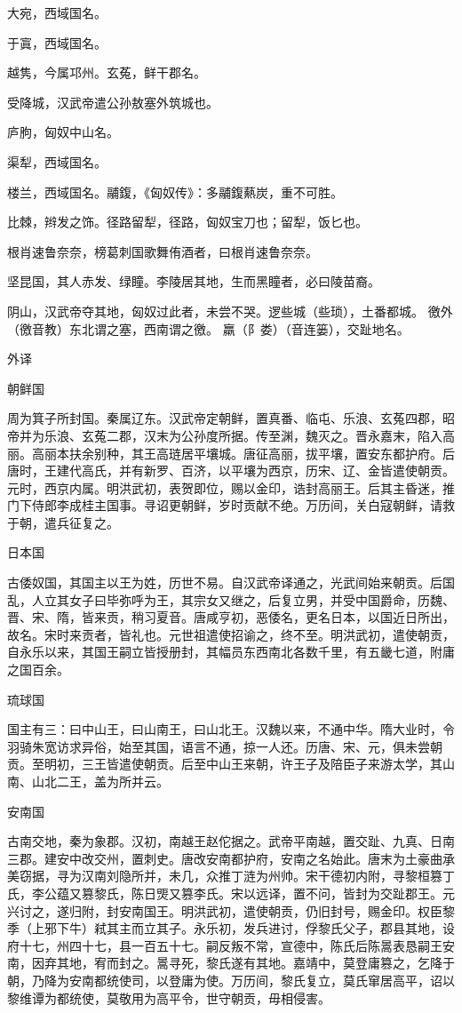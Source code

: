 \documentclass[a4paper,12pt,UTF8,twoside]{ctexbook}
\begin{document}
    大宛，西域国名。
    
    于寘，西域国名。
    
    越隽，今属邛州。玄菟，鲜干郡名。
    
    受降城，汉武帝遣公孙敖塞外筑城也。
    
    庐朐，匈奴中山名。
    
    渠犁，西域国名。
    
    楼兰，西域国名。鬴鍑，《匈奴传》：多鬴鍑爇炭，重不可胜。
    
    比棘，辫发之饰。径路留犁，径路，匈奴宝刀也；留犁，饭匕也。
    
    根肖速鲁奈奈，榜葛刺国歌舞侑酒者，曰根肖速鲁奈奈。
    
    坚昆国，其人赤发、绿瞳。李陵居其地，生而黑瞳者，必曰陵苗裔。
    
    阴山，汉武帝夺其地，匈奴过此者，未尝不哭。逻些城（些琐），土番都城。 徼外（徼音教）东北谓之塞，西南谓之徼。 羸（阝娄）（音连篓），交趾地名。
    
    外译
    
    朝鲜国
    
    周为箕子所封国。秦属辽东。汉武帝定朝鲜，置真番、临屯、乐浪、玄菟四郡，昭帝并为乐浪、玄菟二郡，汉末为公孙度所据。传至渊，魏灭之。晋永嘉末，陷入高丽。高丽本扶余别种，其王高琏居平壤城。唐征高丽，拔平壤，置安东都护府。后唐时，王建代高氏，并有新罗、百济，以平壤为西京，历宋、辽、金皆遣使朝贡。元时，西京内属。明洪武初，表贺即位，赐以金印，诰封高丽王。后其主昏迷，推门下侍郎李成桂主国事。寻诏更朝鲜，岁时贡献不绝。万历间，关白寇朝鲜，请救于朝，遣兵征复之。
    
    日本国
    
    古倭奴国，其国主以王为姓，历世不易。自汉武帝译通之，光武间始来朝贡。后国乱，人立其女子曰毕弥呼为王，其宗女又继之，后复立男，并受中国爵命，历魏、晋、宋、隋，皆来贡，稍习夏音。唐咸亨初，恶倭名，更名日本，以国近日所出，故名。宋时来贡者，皆礼也。元世祖遣使招谕之，终不至。明洪武初，遣使朝贡，自永乐以来，其国王嗣立皆授册封，其幅员东西南北各数千里，有五畿七道，附庸之国百余。
    
    琉球国
    
    国主有三：曰中山王，曰山南王，曰山北王。汉魏以来，不通中华。隋大业时，令羽骑朱宽访求异俗，始至其国，语言不通，掠一人还。历唐、宋、元，俱未尝朝贡。至明初，三王皆遣使朝贡。后至中山王来朝，许王子及陪臣子来游太学，其山南、山北二王，盖为所并云。
    
    安南国
    
    古南交地，秦为象郡。汉初，南越王赵佗据之。武帝平南越，置交趾、九真、日南三郡。建安中改交州，置刺史。唐改安南都护府，安南之名始此。唐末为土豪曲承美窃据，寻为汉南刘隐所并，未几，众推丁涟为州帅。宋干德初内附，寻黎桓篡丁氏，李公蕴又篡黎氏，陈日煚又篡李氏。宋以远译，置不问，皆封为交趾郡王。元兴讨之，遂归附，封安南国王。明洪武初，遣使朝贡，仍旧封号，赐金印。权臣黎季（上邪下牛）弒其主而立其子。永乐初，发兵进讨，俘黎氏父子，郡县其地，设府十七，州四十七，县一百五十七。嗣反叛不常，宣德中，陈氏后陈暠表恳嗣王安南，因弃其地，宥而封之。暠寻死，黎氏遂有其地。嘉靖中，莫登庸篡之，乞降于朝，乃降为安南都统使司，以登庸为使。万历间，黎氏复立，莫氏窜居高平，诏以黎维谭为都统使，莫敬用为高平令，世守朝贡，毋相侵害。
    
\end{document}
